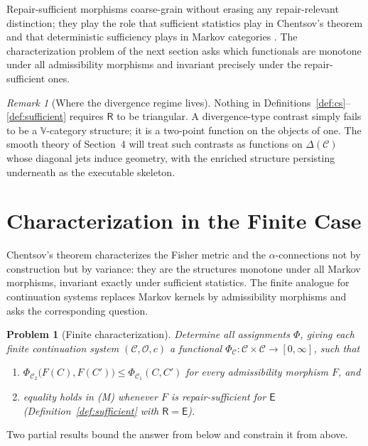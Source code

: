 \documentclass[11pt]{article}
\newtheorem{problem}[theorem]{Problem}
\theoremstyle{remark}
\newtheorem{remark}[theorem]{Remark}
\newcommand{\C}{\mathcal{C}}
\newcommand{\Ops}{\mathcal{O}}
\newcommand{\R}{\mathsf{R}}
\newcommand{\E}{\mathsf{E}}
\begin{document}
Repair-sufficient morphisms coarse-grain without erasing any
repair-relevant distinction; they play the role that sufficient
statistics play in Chentsov's theorem \cite{chentsov} and that
deterministic sufficiency plays in Markov categories \cite{fritz}.
The characterization problem of the next section asks which
functionals are monotone under all admissibility morphisms and
invariant precisely under the repair-sufficient ones.

\begin{remark}[Where the divergence regime lives]
Nothing in Definitions~\ref{def:cs}--\ref{def:sufficient} requires
$\R$ to be triangular. A divergence-type contrast simply fails to be
a $\mathbb{V}$-category structure; it is a two-point function on the
objects of one. The smooth theory of Section~4 will treat such
contrasts as functions on $\Delta(\C)$ whose diagonal jets induce
geometry, with the enriched structure persisting underneath as the
executable skeleton.
\end{remark}

\section{Characterization in the Finite Case}

Chentsov's theorem \cite{chentsov} characterizes the Fisher metric and
the $\alpha$-connections not by construction but by variance: they are
the structures monotone under all Markov morphisms, invariant exactly
under sufficient statistics. The finite analogue for continuation
systems replaces Markov kernels by admissibility morphisms and asks
the corresponding question.

\begin{problem}[Finite characterization]\label{prob:char}
Determine all assignments $\Phi$, giving each finite continuation
system $(\C,\Ops,c)$ a functional
$\Phi_{\C}\colon\C\times\C\to[0,\infty]$, such that
\begin{enumerate}
\item[(M)] $\Phi_{\C_2}\bigl(F(C),F(C')\bigr) \le \Phi_{\C_1}(C,C')$
for every admissibility morphism $F$, and
\item[(I)] equality holds in (M) whenever $F$ is repair-sufficient for
$\E$ (Definition~\ref{def:sufficient} with $\R=\E$).
\end{enumerate}
\end{problem}

Two partial results bound the answer from below and constrain it from
above.
\end{document}
